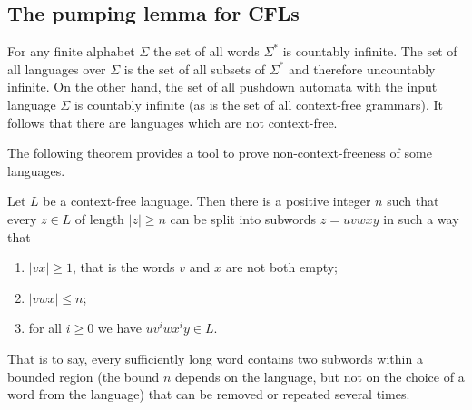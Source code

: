 \begin{page}

\subsection{The pumping lemma for CFLs}
For any finite alphabet $\Sigma$ the set of all words $\Sigma^*$ is countably infinite.
The set of all languages over $\Sigma$ is the set of all subsets of $\Sigma^*$ and therefore uncountably infinite.
On the other hand, the set of all pushdown automata with the input language $\Sigma$ is countably infinite
(as is the set of all context-free grammars).
It follows that there are languages which are not context-free.

The following theorem provides a tool to prove non-context-freeness of some languages.


\end{page}

\begin{page}

\begin{thm}
\label{thm:PumpCFL}
Let $L$ be a context-free language.
Then there is a positive integer $n$ such that every $z \in L$ of length $|z| \ge n$ can be split into subwords $z = uvwxy$ in such a way that
\begin{enumerate}
\item
$|vx| \ge 1$, that is the words $v$ and $x$ are not both empty;
\item
$|vwx| \le n$;
\item
for all $i \ge 0$ we have $uv^iwx^iy \in L$.
\end{enumerate}
\end{thm}

\end{page}

\begin{page}

That is to say, every sufficiently long word contains two subwords within a bounded region
(the bound $n$ depends on the language, but not on the choice of a word from the language)
that can be removed or repeated several times.


\end{page}

